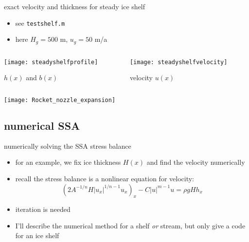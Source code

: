 \begin{frame}{exact velocity and thickness for steady ice shelf }

\small
\begin{itemize}
\item see \texttt{testshelf.m}
\item here $H_g=500$ m, $u_g=50$ m/a
\end{itemize}

\bigskip
\begin{columns}
  \begin{column}{0.5\textwidth}
  \texttt{[image: steadyshelfprofile]}
  
  \begin{center}  
  $h(x)$ and $b(x)$
  \end{center}
  \end{column}
  \begin{column}{0.5\textwidth}
  \texttt{[image: steadyshelfvelocity]}

  \begin{center}  
  velocity $u(x)$
  \end{center}
  \end{column}
\end{columns}

\bigskip
\texttt{[image: Rocket\_nozzle\_expansion]}
\end{frame}


\subsection{numerical SSA}

\begin{frame}{numerically solving the SSA stress balance}

\begin{itemize}
\item for an example, we fix ice thickness $H(x)$ and find the velocity numerically
\item recall the stress balance is a nonlinear equation for velocity:
  $$\left(2 A^{-1/n} H |u_x|^{1/n - 1} u_x\right)_x - C|u|^{m-1}u = \rho g H h_x$$
\item \alert{iteration is needed}
\item I'll describe the numerical method for a shelf \emph{or} stream, but only give a code for an ice shelf
\end{itemize}
\end{frame}


